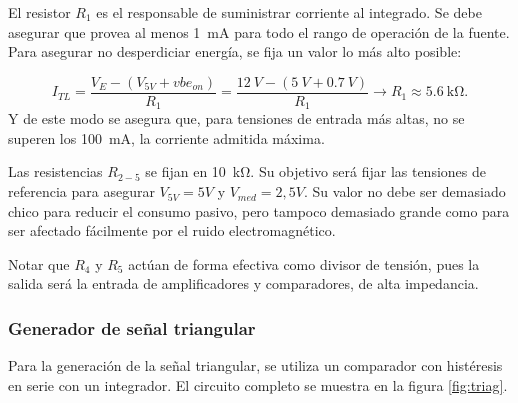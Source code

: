 \documentclass[]{article}
\begin{document}
	El resistor $R_1$ es el responsable de suministrar corriente al integrado. Se debe asegurar que provea al menos \SI{1}{mA} para todo el rango de operación de la fuente. Para asegurar no desperdiciar energía, se fija un valor lo más alto posible:
	
	\begin{equation}
		I_{TL} = \frac{V_E - (V_{5V} + vbe_{on})}{R_1} = \frac{\SI{12}{V} - (\SI{5}{V} + \SI{0.7}{V})}{R_1} \to R_1 \approx \SI{5.6}{\kilo\ohm}.
	\end{equation}
	Y de este modo se asegura que, para tensiones de entrada más altas, no se superen los \SI{100}{mA}, la corriente admitida máxima.
	
	Las resistencias $R_{2-5}$ se fijan en \SI{10}{\kilo\ohm}. Su objetivo será fijar las tensiones de referencia para asegurar $V_{5V} = 5V$ y $V_{med} = 2,5V$. Su valor no debe ser demasiado chico para reducir el consumo pasivo, pero tampoco demasiado grande como para ser afectado fácilmente por el ruido electromagnético.
	
	Notar que $R_4$ y $R_5$ actúan de forma efectiva como divisor de tensión, pues la salida será la entrada de amplificadores y comparadores, de alta impedancia.
	
	\subsubsection{Generador de señal triangular}
	
	Para la generación de la señal triangular, se utiliza un comparador con histéresis en serie con un integrador. El circuito completo se muestra en la figura \ref{fig:triag}.
	
\end{document}
